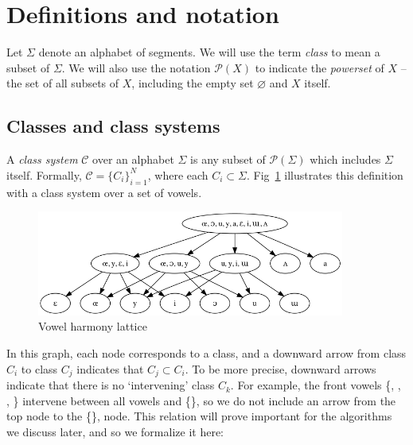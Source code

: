 \documentclass[11pt, oneside]{article}   	%
\begin{document}
\section{Definitions and notation}

Let $\Sigma$ denote an alphabet of segments. We will use the term \textit{class} to mean a subset of $\Sigma$. We will also use the notation $\mathcal P(X)$ to indicate the \textit{powerset} of $X$ -- the set of all subsets of $X$, including the empty set $\varnothing$ and $X$ itself.

\subsection{Classes and class systems}

A \textit{class system} $\mathcal C$ over an alphabet $\Sigma$ is any subset of $\mathcal P(\Sigma)$ which includes $\Sigma$ itself. Formally, $\mathcal C = \{ C_i \}_{i=1}^N$, where each $C_i \subset \Sigma$. Fig~\ref{fig:lattice} illustrates this definition with a class system over a set of vowels.

\begin{figure}[h]
\includegraphics[width=0.9\textwidth]{vowelHarmony_unicode.png}
\caption{Vowel harmony lattice}
\label{fig:lattice}
\end{figure}

In this graph, each node corresponds to a class, and a downward arrow from class $C_i$ to class $C_j$ indicates that $C_j \subset C_i$. To be more precise, downward arrows indicate that there is no `intervening' class $C_k$. For example, the front vowels \{, , , \} intervene between all vowels and \{\}, so we do not include an arrow from the top node to the \{\}, node. This relation will prove important for the algorithms we discuss later, and so we formalize it here: 
\end{document}
